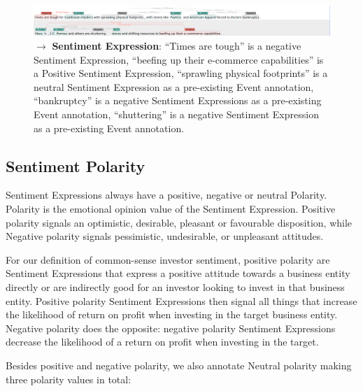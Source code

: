 \begin{figure}[h]
    \centering
    \includegraphics[width=\textwidth]{img/amzn00s9-10 negative event example.png}
    \caption*{$\rightarrow$ \textbf{Sentiment Expression}: ``Times are tough'' is a negative Sentiment Expression, ``beefing up their e-commerce capabilities'' is a Positive Sentiment Expression, ``sprawling physical footprints'' is a neutral Sentiment Expression as a pre-existing Event annotation, ``bankruptcy'' is a negative Sentiment Expressions  as a pre-existing Event annotation, ``shuttering'' is a negative Sentiment Expression as a pre-existing Event annotation.}
    \label{fig:my_label}
\end{figure}


\subsection{Sentiment Polarity}
\label{sec:polaritydefinition}
Sentiment Expressions always have a positive, negative or neutral Polarity.
Polarity is the emotional opinion value of the Sentiment Expression.
Positive polarity signals an optimistic, desirable, pleasant or favourable disposition, while Negative polarity signals pessimistic, undesirable, or unpleasant attitudes.

For our definition of common-sense investor sentiment, positive polarity are Sentiment Expressions that express a positive attitude towards a business entity directly or are indirectly good for an investor looking to invest in that business entity. Positive polarity Sentiment Expressions then signal all things that increase the likelihood of return on profit when investing in the target business entity.
Negative polarity does the opposite: negative polarity Sentiment Expressions decrease the likelihood of a return on profit when investing in the target.

Besides positive and negative polarity, we also annotate Neutral polarity making three polarity values in total:

